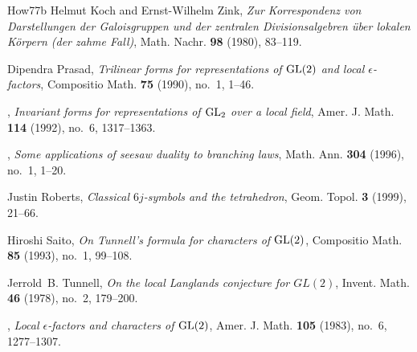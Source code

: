 \documentclass[12pt]{amsart}
\theoremstyle{definition}
\theoremstyle{remark}
\begin{document}
\begin{thebibliography}{How77b}
Helmut Koch and Ernst-Wilhelm Zink, \emph{Zur {K}orrespondenz von
  {D}arstellungen der {G}aloisgruppen und der zentralen {D}ivisionsalgebren
  \"{u}ber lokalen {K}\"{o}rpern (der zahme {F}all)}, Math. Nachr. \textbf{98}
  (1980), 83--119. 

Dipendra Prasad, \emph{Trilinear forms for representations of {${\rm GL}(2)$}
  and local {$\epsilon$}-factors}, Compositio Math. \textbf{75} (1990), no.~1,
  1--46. 

\bysame, \emph{Invariant forms for representations of {${\rm GL}_2$} over a
  local field}, Amer. J. Math. \textbf{114} (1992), no.~6, 1317--1363.

\bysame, \emph{Some applications of seesaw duality to branching laws}, Math.
  Ann. \textbf{304} (1996), no.~1, 1--20. 

Justin Roberts, \emph{Classical {$6j$}-symbols and the tetrahedron}, Geom.
  Topol. \textbf{3} (1999), 21--66. 

Hiroshi Saito, \emph{On {T}unnell's formula for characters of {${\rm GL}(2)$}},
  Compositio Math. \textbf{85} (1993), no.~1, 99--108. 

Jerrold~B. Tunnell, \emph{On the local {L}anglands conjecture for {$GL(2)$}},
  Invent. Math. \textbf{46} (1978), no.~2, 179--200. 

\bysame, \emph{Local {$\epsilon $}-factors and characters of {${\rm GL}(2)$}},
  Amer. J. Math. \textbf{105} (1983), no.~6, 1277--1307. 

\end{thebibliography}
\end{document}
